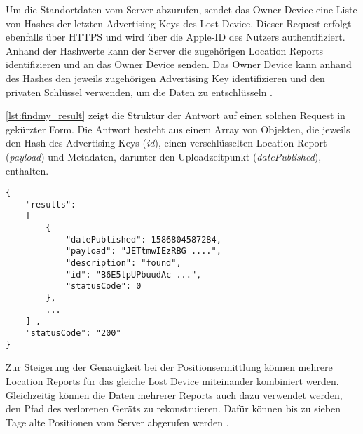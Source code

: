 Um die Standortdaten vom Server abzurufen, sendet das Owner Device eine Liste von Hashes der letzten Advertising Keys des Lost Device.
Dieser Request erfolgt ebenfalls über HTTPS und wird über die Apple-ID des Nutzers authentifiziert.
Anhand der Hashwerte kann der Server die zugehörigen Location Reports identifizieren und an das Owner Device senden.
Das Owner Device kann anhand des Hashes den jeweils zugehörigen Advertising Key identifizieren und den privaten Schlüssel verwenden, um die Daten zu entschlüsseln  \cite{Heinrich_FindMy}.

\autoref{lst:findmy_result} zeigt die Struktur der Antwort auf einen solchen Request in gekürzter Form.
Die Antwort besteht aus einem Array von Objekten, die jeweils den Hash des Advertising Keys (\textit{id}), einen verschlüsselten Location Report (\textit{payload}) und Metadaten, darunter den Uploadzeitpunkt (\textit{datePublished}), enthalten.
\begin{lstlisting}[label=lst:findmy_result,caption={Beispielhafte Antwort beim herunterladen von Location Reports\cite{Heinrich_FindMy}.}]
{
    "results": 
    [
        {
            "datePublished": 1586804587284,
            "payload": "JETtmwIEzRBG ....",
            "description": "found",
            "id": "B6E5tpUPbuudAc ...",
            "statusCode": 0
        },
        ...
    ] ,
    "statusCode": "200"
}
\end{lstlisting}

Zur Steigerung der Genauigkeit bei der Positionsermittlung können mehrere Location Reports für das gleiche Lost Device miteinander kombiniert werden.
Gleichzeitig können die Daten mehrerer Reports auch dazu verwendet werden, den Pfad des verlorenen Geräts zu rekonstruieren.
Dafür können bis zu sieben Tage alte Positionen vom Server abgerufen werden \cite{Heinrich_FindMy}.
